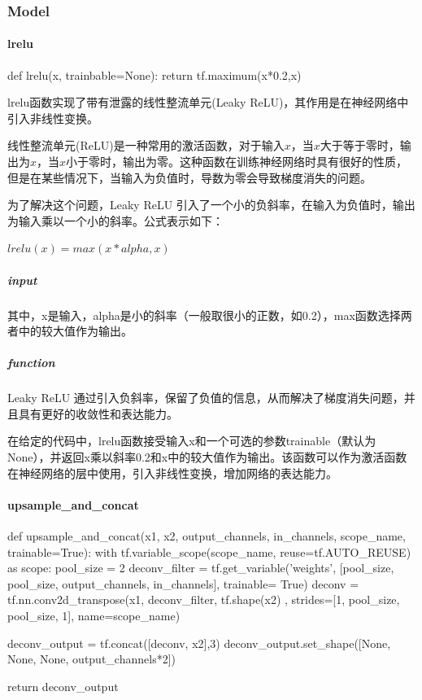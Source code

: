 \documentclass[letterpaper,12pt]{article}
\begin{document}
		\subsubsection{Model}
		
		\paragraph{lrelu}
		
		\begin{python}
			def lrelu(x, trainbable=None):
				return tf.maximum(x*0.2,x)
		\end{python}

		lrelu函数实现了带有泄露的线性整流单元(Leaky ReLU)，其作用是在神经网络中引入非线性变换。
		
		线性整流单元(ReLU)是一种常用的激活函数，对于输入$x$，当$x$大于等于零时，输出为$x$，当$x$小于零时，输出为零。这种函数在训练神经网络时具有很好的性质，但是在某些情况下，当输入为负值时，导数为零会导致梯度消失的问题。
		
		为了解决这个问题，Leaky ReLU 引入了一个小的负斜率，在输入为负值时，输出为输入乘以一个小的斜率。公式表示如下：
		
		$ lrelu(x) = max(x * alpha, x) $
		
		\subparagraph{input}
		
		其中，x是输入，alpha是小的斜率（一般取很小的正数，如0.2），max函数选择两者中的较大值作为输出。
		
		\subparagraph{function}
		
		Leaky ReLU 通过引入负斜率，保留了负值的信息，从而解决了梯度消失问题，并且具有更好的收敛性和表达能力。
		
		在给定的代码中，lrelu函数接受输入x和一个可选的参数trainable（默认为None），并返回x乘以斜率0.2和x中的较大值作为输出。该函数可以作为激活函数在神经网络的层中使用，引入非线性变换，增加网络的表达能力。
		
		\paragraph{upsample\_and\_concat}
		
		\begin{python}
			def upsample_and_concat(x1, x2, output_channels, in_channels, scope_name, trainable=True):
			with tf.variable_scope(scope_name, reuse=tf.AUTO_REUSE) as scope:
			pool_size = 2
			deconv_filter = tf.get_variable('weights', [pool_size, pool_size, output_channels, in_channels], trainable= True)
			deconv = tf.nn.conv2d_transpose(x1, deconv_filter, tf.shape(x2) , strides=[1, pool_size, pool_size, 1], name=scope_name)
			
			deconv_output =  tf.concat([deconv, x2],3)
			deconv_output.set_shape([None, None, None, output_channels*2])
			
			return deconv_output
		\end{python}
		
\end{document}
